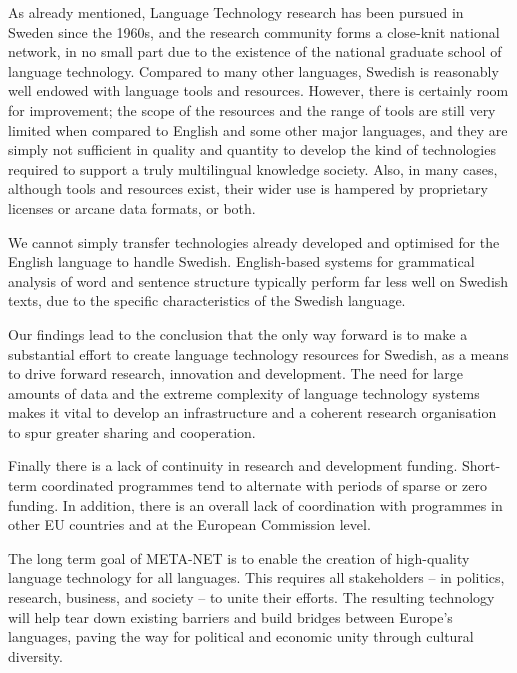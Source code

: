 \begin{multicols}{2}
As already mentioned, Language Technology research has been pursued in
Sweden since the 1960s, and the research community forms a close-knit
national network, in no small part due to the existence of the
national graduate school of language technology. Compared to many
other languages, Swedish is reasonably well endowed with language
tools and resources. However, there is certainly room for improvement;
the scope of the resources and the range of tools are still very
limited when compared to English and some other major languages, and
they are simply not sufficient in quality and quantity to develop the
kind of technologies required to support a truly multilingual
knowledge society. Also, in many cases, although tools and resources
exist, their wider use is hampered by proprietary licenses or arcane
data formats, or both.

We cannot simply transfer technologies already developed and
optimised for the English language to handle Swedish. English-based
systems for grammatical analysis of word and sentence structure
typically perform far less well on Swedish texts, due to the specific
characteristics of the Swedish language.

Our findings lead to the conclusion that the only way forward is to make a substantial effort to create language technology resources for Swedish, as a means to drive forward research, innovation and development. The need for large amounts of data and the extreme complexity of language technology systems makes it vital to develop an infrastructure and a coherent research organisation to spur greater sharing and cooperation.

Finally there is a lack of continuity in research and development funding. Short-term coordinated programmes tend to alternate with periods of sparse or zero funding. In addition, there is an overall lack of coordination with programmes in other EU countries and at the European Commission level.

The long term goal of META-NET is to enable the creation of
high-quality language technology for all languages. This requires all
stakeholders -- in politics, research, business, and society -- to
unite their efforts. The resulting technology will help tear down
existing barriers and build bridges between Europe’s languages, paving
the way for political and economic unity through cultural diversity.
\end{multicols}

\clearpage

